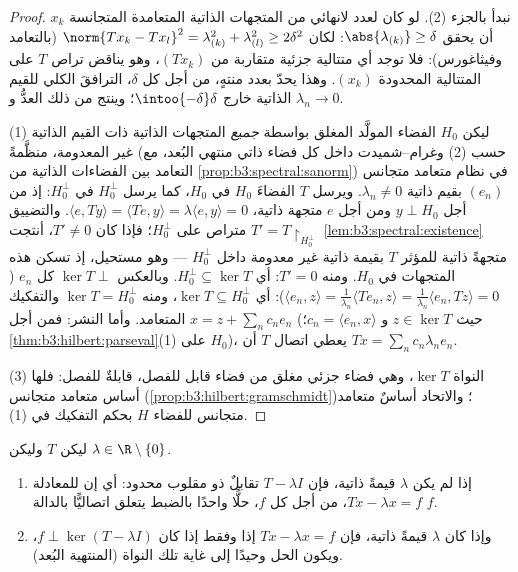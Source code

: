 \begin{proof}
نبدأ بالجزء (2). لو كان لعدد لانهائي من المتجهات الذاتية المتعامدة
المتجانسة $x_k$ أن يحقق $\abs{\lambda_{(k)}} \geq \delta$: لكان $\norm{Tx_k - Tx_l}^2 =
\lambda_{(k)}^2 + \lambda_{(l)}^2 \geq 2\delta^2$ (بالتعامد
وفيثاغورس): فلا توجد أي متتالية جزئية متقاربة من $(Tx_k)$،
وهو يناقض تراص $T$ على المتتالية المحدودة $(x_k)$. وهذا يحدّ
بعدد منتهٍ، من أجل كل $\delta$، الترافقَ الكلي للقيم الذاتية
خارج $\intoo{-\delta}\delta$؛ وينتج من ذلك العدُّ و $\lambda_n \to 0$.

(1) ليكن $H_0$ الفضاء المولَّد المغلق بواسطة \emph{جميع} المتجهات
الذاتية ذات القيم الذاتية غير المعدومة، منظَّمةً (حسب (2)
وغرام--شميدت داخل كل فضاء ذاتي منتهي البُعد، مع التعامد بين
الفضاءات الذاتية من \cref{prop:b3:spectral:sanorm}) في نظام متعامد متجانس $(e_n)$
بقيم ذاتية $\lambda_n \neq 0$. ويرسل $T$ الفضاءَ $H_0$ في $H_0$، كما يرسل
$H_0^\perp$ في $H_0^\perp$: إذ من أجل $y
\perp H_0$ ومن أجل $e$ متجهة
ذاتية، $\langle e, Ty\rangle =
\langle Te, y\rangle = \lambda\langle e, y\rangle = 0$. والتضييق $T' = T\restriction_{H_0^\perp}$ متراص  على  $H_0^\perp$؛ فإذا كان $T' \neq
0$، أنتجت \cref{lem:b3:spectral:existence} متجهةً
ذاتية للمؤثر $T$ بقيمة ذاتية غير معدومة داخل $H_0^\perp$ ---
وهو مستحيل، إذ تسكن هذه المتجهات في $H_0$. ومنه $T' = 0$: أي
$H_0^\perp \subseteq \ker T$. وبالعكس $\ker T \perp$ كل $e_n$ ($\langle e_n, z\rangle = \frac1{\lambda_n}\langle
Te_n, z\rangle = \frac1{\lambda_n}\langle e_n, Tz\rangle =
0$): أي
$\ker T \subseteq H_0^\perp$، ومنه $\ker T =
H_0^\perp$ والتفكيك المتعامد. وأما النشر: فمن أجل
$x = z + \sum_nc_ne_n$ (حيث $z \in \ker T$ و $c_n = \langle
e_n, x\rangle$؛ \cref{thm:b3:hilbert:parseval}(1) على $H_0$)،
يعطي اتصال $T$ أن $Tx = \sum_nc_n\lambda_ne_n$.

(3) النواة $\ker T$، وهي فضاء جزئي مغلق من فضاء قابل للفصل،
قابلةٌ للفصل: فلها أساس متعامد متجانس (\cref{prop:b3:hilbert:gramschmidt})؛ والاتحاد
أساسٌ متعامد متجانس للفضاء $H$ بحكم التفكيك في (1).
\end{proof}

\begin{theorem}
\label{thm:b3:spectral:fredholm}
ليكن $T$   وليكن $\lambda \in \R\setminus
\{0\}$.
\begin{enumerate}
  \item إذا لم يكن $\lambda$ قيمةً ذاتية، فإن $T - \lambda I$
        تقابلٌ ذو مقلوب محدود: أي إن للمعادلة $Tx - \lambda x = f$، من أجل
        كل $f$، حلًّا واحدًا بالضبط يتعلق اتصاليًّا بالدالة $f$.
  \item وإذا كان $\lambda$ قيمةً ذاتية، فإن $Tx - \lambda x = f$ 
        إذا وفقط إذا كان $f \perp \ker(T - \lambda I)$، ويكون الحل وحيدًا إلى غاية
        تلك النواة (المنتهية البُعد).
\end{enumerate}
\end{theorem}

